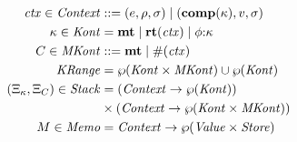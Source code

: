 \begin{align*}
  \mathit{ctx} \in \mathit{Context} &::= (e,\rho,\sigma) \mathrel{\mid} (\mathbf{comp}(\kappa),v,\sigma) \\
  \kappa \in \mathit{Kont} &= \mathbf{mt} \mathrel{\mid} \mathbf{rt}(\mathit{ctx}) \mathrel{\mid} \phi{\tt :} \kappa \\
  C \in \mathit{MKont} &::= \mathbf{mt} \mathrel{\mid} \#(\mathit{ctx}) \\
  \mathit{KRange} &= \wp(\mathit{Kont} \times \mathit{MKont}) \cup \wp(\mathit{Kont}) \\
  (\Xi_\kappa,\Xi_C) \in \mathit{Stack} &= (\mathit{Context} \to \wp(\mathit{Kont})) \\
                                        &\times (\mathit{Context} \to \wp(\mathit{Kont} \times \mathit{MKont})) \\
  M \in \mathit{Memo} &= \mathit{Context} \to \wp(\mathit{Value} \times \mathit{Store})
\end{align*}


